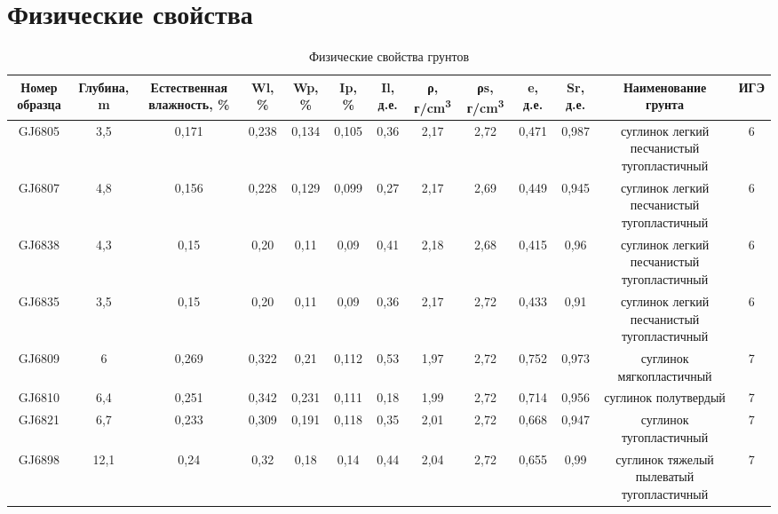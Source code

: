 \chapter{Физические свойства}\label{app:phisics}

\begin{sidewaystable}[]
    \centering
    \small
    \caption{Физические свойства грунтов}
    \begin{tabular}{|c|c|c|c|c|c|c|c|c|c|c|c|c|}
    \hline
    Номер   образца & Глубина, \si{\meter} & Естественная   влажность, \% & Wl, \% & Wp, \% & Ip, \% & Il, д.е. & ρ, г/\si{\centi\meter^3} & ρs, г/\si{\centi\meter^3} & e, д.е. & Sr, д.е. & Наименование   грунта                        & ИГЭ \\ \hline
    GJ6805          & 3,5        & 0,171                        & 0,238  & 0,134  & 0,105  & 0,36     & 2,17     & 2,72      & 0,471   & 0,987    & суглинок легкий   песчанистый тугопластичный & 6   \\ \hline
    GJ6807          & 4,8        & 0,156                        & 0,228  & 0,129  & 0,099  & 0,27     & 2,17     & 2,69      & 0,449   & 0,945    & суглинок легкий   песчанистый тугопластичный & 6   \\ \hline
    GJ6838          & 4,3        & 0,15                         & 0,20   & 0,11   & 0,09   & 0,41     & 2,18     & 2,68      & 0,415   & 0,96     & суглинок легкий   песчанистый тугопластичный & 6   \\ \hline
    GJ6835          & 3,5        & 0,15                         & 0,20   & 0,11   & 0,09   & 0,36     & 2,17     & 2,72      & 0,433   & 0,91     & суглинок легкий   песчанистый тугопластичный & 6   \\ \hline
    GJ6809          & 6          & 0,269                        & 0,322  & 0,21   & 0,112  & 0,53     & 1,97     & 2,72      & 0,752   & 0,973    & суглинок   мягкопластичный                   & 7   \\ \hline
    GJ6810          & 6,4        & 0,251                        & 0,342  & 0,231  & 0,111  & 0,18     & 1,99     & 2,72      & 0,714   & 0,956    & суглинок полутвердый                         & 7   \\ \hline
    GJ6821          & 6,7        & 0,233                        & 0,309  & 0,191  & 0,118  & 0,35     & 2,01     & 2,72      & 0,668   & 0,947    & суглинок   тугопластичный                    & 7   \\ \hline
    GJ6898          & 12,1       & 0,24                         & 0,32   & 0,18   & 0,14   & 0,44     & 2,04     & 2,72      & 0,655   & 0,99     & суглинок тяжелый   пылеватый тугопластичный  & 7   \\ \hline

\end{tabular}
\end{sidewaystable}
